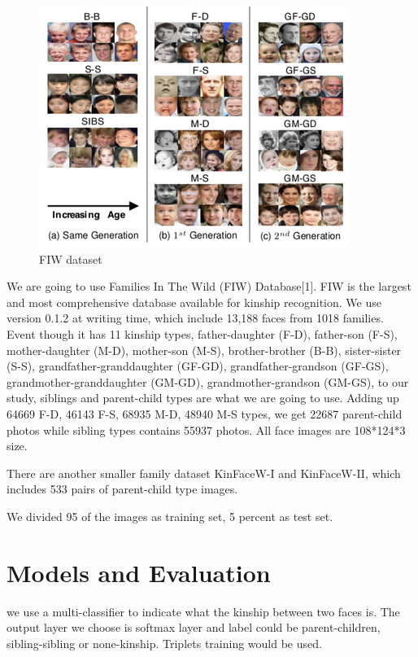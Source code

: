 \documentclass{article}
\begin{document}
\begin{figure}
\includegraphics[width=0.9\linewidth]{facepairs}
\caption{FIW dataset}
\label{fig:wrapfig}
\end{figure}

We are going to use Families In The Wild (FIW) Database[1]. FIW is the largest and
most comprehensive database available for kinship recognition. We use version 0.1.2 at writing time, which include 13,188 faces from 1018 families. Event though it has 11 kinship types, father-daughter (F-D), father-son (F-S), mother-daughter (M-D), mother-son (M-S), brother-brother (B-B), sister-sister (S-S), grandfather-granddaughter (GF-GD), grandfather-grandson (GF-GS),  grandmother-granddaughter (GM-GD), grandmother-grandson (GM-GS), to our study, siblings and parent-child types are what we are going to use. Adding up 64669 F-D, 46143 F-S, 68935 M-D, 48940 M-S types, we get 22687 parent-child photos while sibling types contains 55937 photos. All face images are 108*124*3 size.

There are another smaller family dataset KinFaceW-I and KinFaceW-II, which
includes 533 pairs of parent-child type images.

We divided 95 of the images as training set, 5 percent as test set.

\section{Models and Evaluation}
we use a multi-classifier to indicate what the kinship between two faces is. The
output layer we choose is softmax layer and label could be parent-children,
sibling-sibling or none-kinship.  Triplets training would be used.
\end{document}
